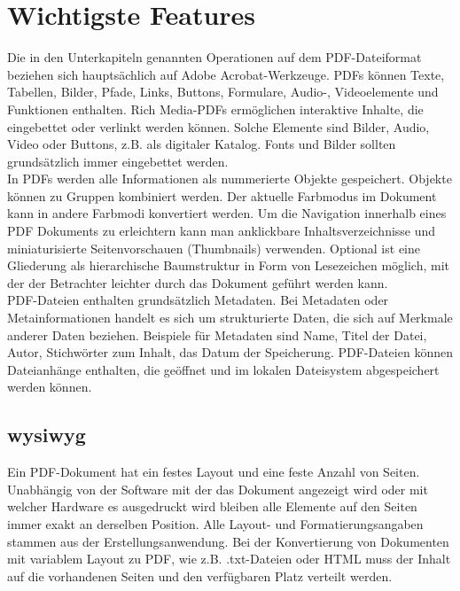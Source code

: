 \section{Wichtigste Features}
Die in den Unterkapiteln genannten Operationen auf dem PDF-Dateiformat beziehen sich hauptsächlich auf Adobe Acrobat-Werkzeuge. PDFs können Texte, Tabellen, Bilder, Pfade, Links, Buttons, Formulare, Audio-, Videoelemente und Funktionen enthalten. Rich Media-PDFs ermöglichen interaktive Inhalte, die eingebettet oder verlinkt werden können. Solche Elemente sind Bilder, Audio, Video oder Buttons, z.B. als digitaler Katalog. \cite{wiki-pdf-engl} Fonts und Bilder sollten grundsätzlich immer eingebettet werden. \\
In PDFs werden alle Informationen als nummerierte Objekte gespeichert. Objekte können zu Gruppen kombiniert werden. Der aktuelle Farbmodus im Dokument kann in andere Farbmodi konvertiert werden. Um die Navigation innerhalb eines PDF Dokuments zu erleichtern kann man anklickbare Inhaltsverzeichnisse und miniaturisierte Seitenvorschauen (Thumbnails) verwenden. Optional ist eine Gliederung als hierarchische Baumstruktur in Form von Lesezeichen möglich, mit der der Betrachter leichter durch das Dokument geführt werden kann. \\
PDF-Dateien enthalten grundsätzlich Metadaten. Bei Metadaten oder Metainformationen handelt es sich um strukturierte Daten, die sich auf Merkmale anderer Daten beziehen. Beispiele für Metadaten sind Name, Titel der Datei, Autor, Stichwörter zum Inhalt, das Datum der Speicherung. PDF-Dateien können Dateianhänge enthalten, die geöffnet und im lokalen Dateisystem abgespeichert werden können. \cite{wiki-pdf-engl}

\subsection{\gls{wysiwyg}}
Ein PDF-Dokument hat ein festes Layout und eine feste Anzahl von Seiten. Unabhängig von der Software mit der das Dokument angezeigt wird oder mit welcher Hardware es ausgedruckt wird bleiben alle Elemente auf den Seiten immer exakt an derselben Position. Alle Layout- und Formatierungsangaben stammen aus der Erstellungsanwendung. Bei der Konvertierung von Dokumenten mit variablem Layout zu PDF, wie z.B. .txt-Dateien oder HTML muss der Inhalt auf die vorhandenen Seiten und den verfügbaren Platz verteilt werden. 

